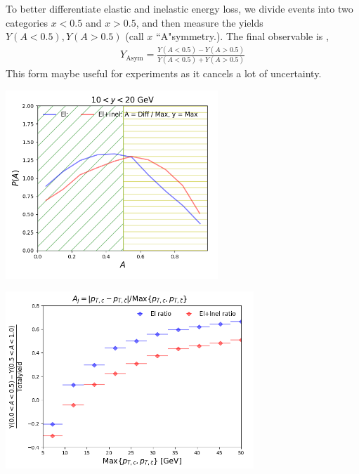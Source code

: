 \documentclass[11pt]{beamer}
\begin{document}
\begin{frame}
To better differentiate elastic and inelastic energy loss, we divide events into two categories $x<0.5$ and $x>0.5$, and then measure the yields $Y(A<0.5), Y(A>0.5)$ (call $x$ ``A"symmetry.).
The final observable is ,
\begin{eqnarray}
\nonumber
Y_{\textrm{Asym}} = \frac{Y(A<0.5) - Y(A>0.5)}{ Y(A<0.5) + Y(A>0.5)}
\end{eqnarray}
This form maybe useful for experiments as it cancels a lot of uncertainty.
\begin{overprint}
\begin{center}
\includegraphics[width=0.6\textwidth]{fig/Event-avg-phase-space-divided.png}
\end{center}
\begin{center}
\includegraphics[width=0.7\textwidth]{fig/Event-avg-Yasym.png}
\end{center}
\end{overprint}
\end{frame}
\end{document}
